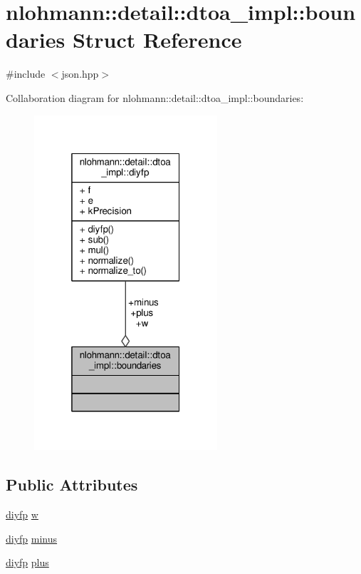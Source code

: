 \hypertarget{structnlohmann_1_1detail_1_1dtoa__impl_1_1boundaries}{}\section{nlohmann\+:\+:detail\+:\+:dtoa\+\_\+impl\+:\+:boundaries Struct Reference}
\label{structnlohmann_1_1detail_1_1dtoa__impl_1_1boundaries}


{\ttfamily \#include $<$json.\+hpp$>$}



Collaboration diagram for nlohmann\+:\+:detail\+:\+:dtoa\+\_\+impl\+:\+:boundaries\+:
\nopagebreak
\begin{figure}[H]
\begin{center}
\leavevmode
\includegraphics[width=193pt]{structnlohmann_1_1detail_1_1dtoa__impl_1_1boundaries__coll__graph}
\end{center}
\end{figure}
\subsection*{Public Attributes}
\begin{DoxyCompactItemize}
\item 
\hyperlink{structnlohmann_1_1detail_1_1dtoa__impl_1_1diyfp}{diyfp} \hyperlink{structnlohmann_1_1detail_1_1dtoa__impl_1_1boundaries_ad1668c60aeade5f2557fafed8b8aee1a}{w}
\item 
\hyperlink{structnlohmann_1_1detail_1_1dtoa__impl_1_1diyfp}{diyfp} \hyperlink{structnlohmann_1_1detail_1_1dtoa__impl_1_1boundaries_aec4e5028333c01f3229062f31ce16763}{minus}
\item 
\hyperlink{structnlohmann_1_1detail_1_1dtoa__impl_1_1diyfp}{diyfp} \hyperlink{structnlohmann_1_1detail_1_1dtoa__impl_1_1boundaries_a3321ae2816a6ec5250a0d8e29f798232}{plus}
\end{DoxyCompactItemize}


